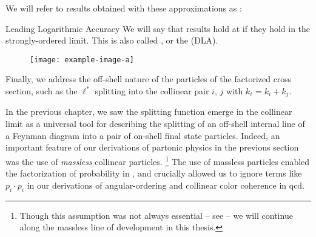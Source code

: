 We will refer to results obtained with these approximations as :

\begin{definitionbox}{Leading Logarithmic Accuracy}{}
    We will say that results hold at  if they hold in the strongly-ordered limit.
    This is also called , or the  (DLA).
\end{definitionbox}



\begin{figure}[t]
    \centering
    \texttt{[image: example-image-a]}
    \caption[The ripple picture of the partonic cascade ]{}
    \label{fig:}
\end{figure}




Finally, we address the off-shell nature of the particles of the factorized cross section, such as the \(\ell^*\) splitting into the collinear pair \(i,\,j\) with \(k_\ell = k_i + k_j\).

In the previous chapter, we saw the splitting function emerge in the collinear limit as a universal tool for describing the splitting of an off-shell internal line of a Feynman diagram into a pair of on-shell final state particles.
%
Indeed, an important feature of our derivations of partonic physics in the previous section was the use of \textit{massless} collinear particles.%
\footnote{Though this assumption was not always essential -- see  -- we will continue along the massless line of development in this thesis.}
%
The use of massless particles enabled the factorization of probability in , and crucially allowed us to ignore terms like \(p_i\cdot p_i\) in our derivations of angular-ordering and collinear color coherence in \gls{qcd}.

